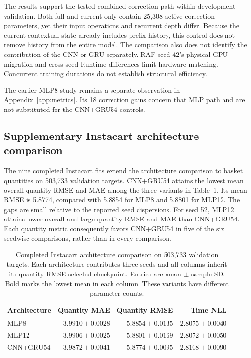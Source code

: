 \documentclass[runningheads]{llncs}
\begin{document}
The results support the tested combined correction path within development validation. Both full and current-only contain 25,308 active correction parameters, yet their input operations and recurrent depth differ. Because the current contextual state already includes prefix history, this control does not remove history from the entire model. The comparison also does not identify the contribution of the CNN or GRU separately. RAF seed 42's physical GPU migration and cross-seed Runtime differences limit hardware matching. Concurrent training durations do not establish structural efficiency.

The earlier MLP8 study remains a separate observation in Appendix~\ref{app:metrics}. Its 18 correction gains concern that MLP path and are not substituted for the CNN+GRU54 controls.

\subsection{Supplementary Instacart architecture comparison}
\label{sec:instacart-results}
The nine completed Instacart fits extend the architecture comparison to basket quantities on 503,733 validation targets. CNN+GRU54 attains the lowest mean overall quantity RMSE and MAE among the three variants in Table~\ref{tab:instacart-architecture}. Its mean RMSE is 5.8774, compared with 5.8854 for MLP8 and 5.8801 for MLP12. The gaps are small relative to the reported seed dispersions. For seed 52, MLP12 attains lower overall and large-quantity RMSE and MAE than CNN+GRU54. Each quantity metric consequently favors CNN+GRU54 in five of the six seedwise comparisons, rather than in every comparison.

\begin{table}[t]
\caption{Completed Instacart architecture comparison on 503,733 validation targets. Each architecture contributes three seeds and all columns inherit its quantity-RMSE-selected checkpoint. Entries are mean $\pm$ sample SD. Bold marks the lowest mean in each column. These variants have different parameter counts.}
\label{tab:instacart-architecture}
\centering\small
\setlength{\tabcolsep}{4pt}
\begin{tabular}{@{}lrrr@{}}
\toprule
Architecture & Quantity MAE & Quantity RMSE & Time NLL\\
\midrule
MLP8 & $3.9910\pm0.0028$ & $5.8854\pm0.0135$ & $2.8075\pm0.0040$\\
MLP12 & $3.9906\pm0.0025$ & $5.8801\pm0.0169$ & $\mathbf{2.8072\pm0.0050}$\\
CNN+GRU54 & $\mathbf{3.9872\pm0.0041}$ & $\mathbf{5.8774\pm0.0095}$ & $2.8108\pm0.0090$\\
\bottomrule
\end{tabular}
\end{table}
\end{document}
